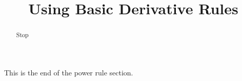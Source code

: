 \documentclass[handout]{ximera}
\title{Using Basic Derivative Rules}
\begin{document}
\begin{abstract} Stop
\end{abstract}

\maketitle

This is the end of the power rule section.
\end{document}
